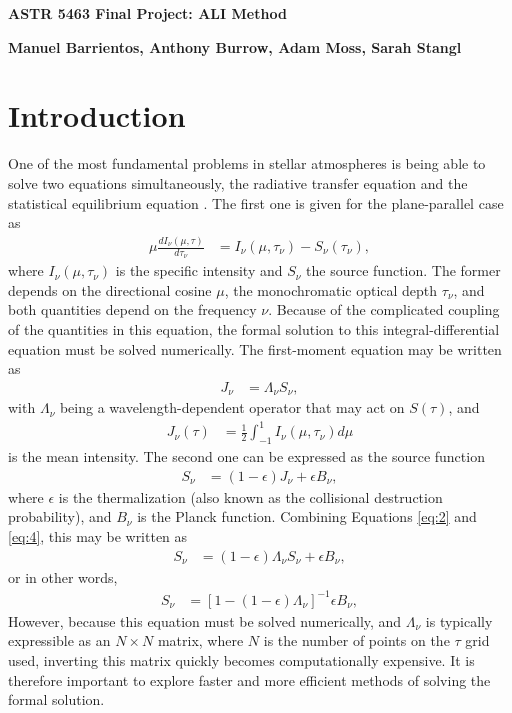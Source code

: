 \documentclass[12pt]{article}
\begin{document}
\begin{center}\begin{LARGE}
\textbf{ASTR 5463 Final Project: ALI Method}
\end{LARGE}\end{center}

\begin{center}
\textbf{Manuel Barrientos, Anthony Burrow, Adam Moss, Sarah Stangl}
\end{center}


\section{Introduction}


One of the most fundamental problems in stellar atmospheres is being able to solve two equations simultaneously, the radiative transfer equation and the statistical equilibrium equation \citep[e.g.,][]{OandK1987,hubeny2003}. The first one is given for the plane-parallel case as
\begin{align}
\mu \frac{d I_\nu(\mu, \tau)}{d \tau_\nu}
&=
I_\nu(\mu, \tau_\nu) - S_\nu(\tau_\nu),
\end{align}
where $I_\nu(\mu, \tau_\nu)$ is the specific intensity and $S_\nu$ the source function. The former depends on the directional cosine $\mu$, the monochromatic optical depth $\tau_\nu$, and both quantities depend on the frequency $\nu$. Because of the complicated coupling of the quantities in this equation, the formal solution to this integral-differential equation must be solved numerically. The first-moment equation may be written as
\begin{align}
J_\nu
&=
\Lambda_\nu S_\nu,
\label{eq:2}
\end{align}
with $\Lambda_\nu$ being a wavelength-dependent operator that may act on $S(\tau)$, and
\begin{align}
J_\nu(\tau)
&=
\frac{1}{2} \int_{-1}^1 I_\nu(\mu, \tau_\nu) d\mu
\end{align}
is the mean intensity. The second one can be expressed as the source function
\begin{align}
S_\nu
&=
(1 - \epsilon) J_\nu + \epsilon B_\nu,
\label{eq:4}
\end{align}
where $\epsilon$ is the thermalization (also known as the collisional destruction probability), and $B_\nu$ is the Planck function. Combining Equations \ref{eq:2} and \ref{eq:4}, this may be written as
\begin{align}
S_\nu
&=
(1 - \epsilon) \Lambda_\nu S_\nu + \epsilon B_\nu,
\end{align}
or in other words,
\begin{align}
S_\nu
&=
[1 - (1 - \epsilon) \Lambda_\nu]^{-1} \epsilon B_\nu,
\end{align}
However, because this equation must be solved numerically, and $\Lambda_\nu$ is typically expressible as an $N \times N$ matrix, where $N$ is the number of points on the $\tau$ grid used, inverting this matrix quickly becomes computationally expensive. It is therefore important to explore faster and more efficient methods of solving the formal solution.
\end{document}
